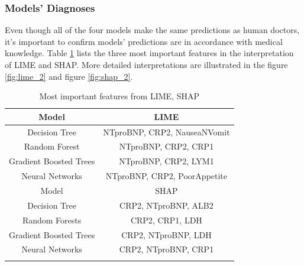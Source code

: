 \subsubsection{\textbf{Models' Diagnoses}}

Even though all of the four models make the same predictions as human doctors, it's important to confirm models' predictions are in accordance with medical knowledge. Table \ref{tab:important_feature_patient} lists the three most important features in the interpretation of LIME and SHAP. More detailed interpretations are illustrated in the figure \ref{fig:lime_2} and figure \ref{fig:shap_2}.

\begin{table}[H]
\centering
\caption{Most important features from LIME, SHAP}
\begin{tabular}{@{}cc@{}}
\toprule
Model                   & LIME                          \\  
\toprule
Decision Tree           & NTproBNP, CRP2, NauseaNVomit  \\
Random Forest           & NTproBNP, CRP2, CRP1          \\  
Gradient Boosted Trees  & NTproBNP, CRP2, LYM1          \\  
Neural Networks         & NTproBNP, CRP2, PoorAppetite  \\
\toprule
Model                   & SHAP  \\ 
\toprule
Decision Tree           & CRP2, NTproBNP, ALB2 \\
Random Forests          & CRP2, CRP1, LDH      \\
Gradient Boosted Trees  & CRP2, NTproBNP, LDH  \\
Neural Networks         & CRP2, NTproBNP, CRP1 \\  
\bottomrule
\label{tab:important_feature_patient}
\end{tabular}
\end{table}




